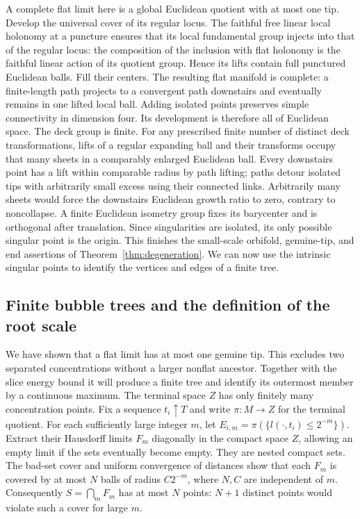 A complete flat limit here is a global Euclidean quotient with at
most one tip. Develop the universal cover of its regular locus.
The faithful free linear local holonomy at a puncture ensures that
its local fundamental group injects into that of the regular locus:
the composition of the inclusion with flat holonomy is the faithful
linear action of its quotient group. Hence its lifts contain full
punctured Euclidean balls. Fill their centers.
The resulting flat manifold is complete: a finite-length path
projects to a convergent path downstairs and eventually remains in
one lifted local ball. Adding isolated points preserves simple
connectivity in dimension four. Its development is therefore all
of Euclidean space. The deck group is finite. For any prescribed
finite number of distinct deck transformations, lifts of a regular
expanding ball and their transforms occupy that many sheets in a
comparably enlarged Euclidean ball. Every downstairs point has a
lift within comparable radius by path lifting; paths detour isolated
tips with arbitrarily small excess using their connected links.
Arbitrarily many sheets would force the downstairs Euclidean growth
ratio to zero, contrary to noncollapse. A finite Euclidean isometry
group fixes its barycenter and is orthogonal after translation.
Since singularities are isolated, its only possible singular point
is the origin. This finishes the small-scale orbifold, genuine-tip,
and end assertions of Theorem~\ref{thm:degeneration}. We can now use
the intrinsic singular points to identify the vertices and edges of
a finite tree.

\subsection{Finite bubble trees and the definition of the root scale}
\label{geom:trees-root}

We have shown that a flat limit has at most one genuine tip. This
excludes two separated concentrations without a larger nonflat ancestor.
Together with the slice energy bound it will produce a finite tree and
identify its outermost member by a continuous maximum.
The terminal space $Z$ has only finitely many concentration points.
Fix a sequence $t_i\uparrow T$ and write $\pi:M\to Z$ for the
terminal quotient. For each sufficiently large integer $m$, let
$E_{i,m}=\pi(\{l(\cdot,t_i)\leq2^{-m}\})$. Extract their Hausdorff
limits $F_m$ diagonally in the compact space $Z$, allowing an empty
limit if the sets eventually become empty. They are nested compact
sets. The bad-set cover and uniform convergence of distances show
that each $F_m$ is covered by at most $N$ balls of radius $C2^{-m}$,
where $N,C$ are independent of $m$. Consequently
$S=\bigcap_mF_m$ has at most $N$ points: $N+1$ distinct points
would violate such a cover for large $m$.

